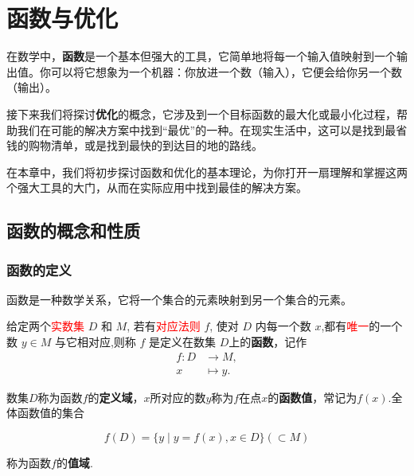 \chapter{函数与优化}

在数学中，\textcolor{main}{\bf 函数}是一个基本但强大的工具，它简单地将每一个输入值映射到一个输出值。你可以将它想象为一个机器：你放进一个数（输入），它便会给你另一个数（输出）。

接下来我们将探讨\textcolor{main}{\bf 优化}的概念，它涉及到一个目标函数的最大化或最小化过程，帮助我们在可能的解决方案中找到“最优”的一种。在现实生活中，这可以是找到最省钱的购物清单，或是找到最快的到达目的地的路线。

在本章中，我们将初步探讨函数和优化的基本理论，为你打开一扇理解和掌握这两个强大工具的大门，从而在实际应用中找到最佳的解决方案。

\section{函数的概念和性质}
\subsection{函数的定义}

\begin{note}
    函数是一种数学关系，它将一个集合的元素映射到另一个集合的元素。
\end{note}

\begin{definition}[函数]
给定两个\textcolor{red}{实数集} $D$ 和 $M$, 若有\textcolor{red}{对应法则} $f$, 使对 $D$ 内每一个数 $x$,都有\textcolor{red}{唯一}的一个数 $y \in M$ 与它相对应,则称 $f$ 是定义在数集 $D$上的\textcolor{third}{\bf 函数}，记作
\begin{equation}
\begin{aligned}
    f:D & \rightarrow M, \\
    x & \mapsto y.
\end{aligned}
\end{equation}

数集$D$称为函数$f$的\textcolor{third}{\bf 定义域}，$x$所对应的数$y$称为$f$在点$x$的\textcolor{third}{\bf 函数值}，常记为$f(x)$.全体函数值的集合

\begin{equation*}
    f(D) = \{y\mid y=f(x),x\in D\} (\subset M)
\end{equation*}

称为函数$f$的\textcolor{third}{\bf 值域}.

\end{definition}

